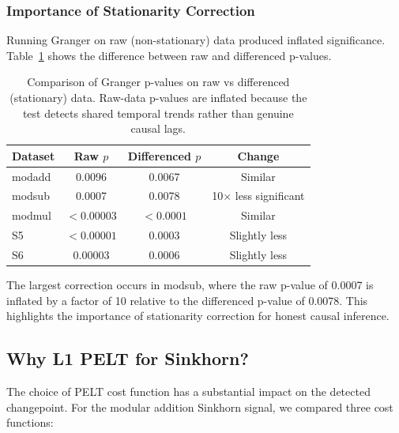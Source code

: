 \documentclass[12pt,twoside]{article}
\begin{document}
\subsubsection{Importance of Stationarity Correction}

Running Granger on raw (non-stationary) data produced inflated significance.
Table~\ref{tab:granger_comparison} shows the difference between raw and
differenced p-values.

\begin{table}[t]
  \centering
  \caption{Comparison of Granger p-values on raw vs differenced (stationary)
           data. Raw-data p-values are inflated because the test detects
           shared temporal trends rather than genuine causal lags.}
  \label{tab:granger_comparison}
  \begin{tabular}{lccc}
    \toprule
    Dataset & Raw \(p\) & Differenced \(p\) & Change \\
    \midrule
    modadd & 0.0096 & 0.0067 & Similar \\
    modsub & 0.0007 & 0.0078 & 10$\times$ less significant \\
    modmul & \(<0.00003\) & \(<0.0001\) & Similar \\
    S5 & \(<0.00001\) & 0.0003 & Slightly less \\
    S6 & 0.00003 & 0.0006 & Slightly less \\
    \bottomrule
  \end{tabular}
\end{table}

The largest correction occurs in modsub, where the raw p-value of 0.0007 is
inflated by a factor of 10 relative to the differenced p-value of 0.0078.
This highlights the importance of stationarity correction for honest causal
inference.

\subsection{Why L1 PELT for Sinkhorn?}
\label{sec:why_l1}

The choice of PELT cost function has a substantial impact on the detected
changepoint. For the modular addition Sinkhorn signal, we compared three
cost functions:
\end{document}
